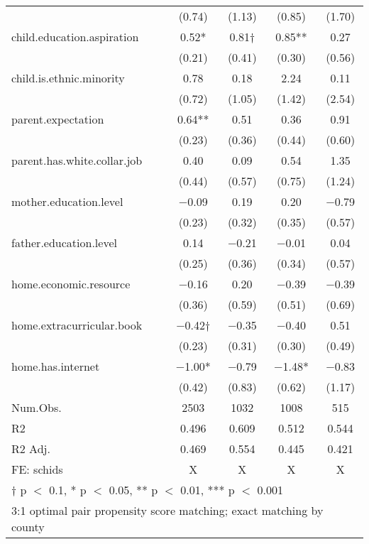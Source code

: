 \documentclass[
  man,floatsintext]{apa7}
\begin{document}
\begin{table}
\begin{tabular}[t]{lcccc}
 & (\num{0.74}) & (\num{1.13}) & (\num{0.85}) & (\num{1.70})\\
child.education.aspiration & \num{0.52}* & \num{0.81}† & \num{0.85}** & \num{0.27}\\
 & (\num{0.21}) & (\num{0.41}) & (\num{0.30}) & (\num{0.56})\\
child.is.ethnic.minority & \num{0.78} & \num{0.18} & \num{2.24} & \num{0.11}\\
 & (\num{0.72}) & (\num{1.05}) & (\num{1.42}) & (\num{2.54})\\
parent.expectation & \num{0.64}** & \num{0.51} & \num{0.36} & \num{0.91}\\
 & (\num{0.23}) & (\num{0.36}) & (\num{0.44}) & (\num{0.60})\\
parent.has.white.collar.job & \num{0.40} & \num{0.09} & \num{0.54} & \num{1.35}\\
 & (\num{0.44}) & (\num{0.57}) & (\num{0.75}) & (\num{1.24})\\
mother.education.level & \num{-0.09} & \num{0.19} & \num{0.20} & \num{-0.79}\\
 & (\num{0.23}) & (\num{0.32}) & (\num{0.35}) & (\num{0.57})\\
father.education.level & \num{0.14} & \num{-0.21} & \num{-0.01} & \num{0.04}\\
 & (\num{0.25}) & (\num{0.36}) & (\num{0.34}) & (\num{0.57})\\
home.economic.resource & \num{-0.16} & \num{0.20} & \num{-0.39} & \num{-0.39}\\
 & (\num{0.36}) & (\num{0.59}) & (\num{0.51}) & (\num{0.69})\\
home.extracurricular.book & \num{-0.42}† & \num{-0.35} & \num{-0.40} & \num{0.51}\\
 & (\num{0.23}) & (\num{0.31}) & (\num{0.30}) & (\num{0.49})\\
home.has.internet & \num{-1.00}* & \num{-0.79} & \num{-1.48}* & \num{-0.83}\\
 & (\num{0.42}) & (\num{0.83}) & (\num{0.62}) & (\num{1.17})\\
\midrule
Num.Obs. & \num{2503} & \num{1032} & \num{1008} & \num{515}\\
R2 & \num{0.496} & \num{0.609} & \num{0.512} & \num{0.544}\\
R2 Adj. & \num{0.469} & \num{0.554} & \num{0.445} & \num{0.421}\\
FE: schids & X & X & X & X\\
\bottomrule
\multicolumn{5}{l}{\rule{0pt}{1em}† p $<$ 0.1, * p $<$ 0.05, ** p $<$ 0.01, *** p $<$ 0.001}\\
\multicolumn{5}{l}{\rule{0pt}{1em}3:1 optimal pair propensity score matching; exact matching by county}\\
\end{tabular}
\end{table}
\end{document}
